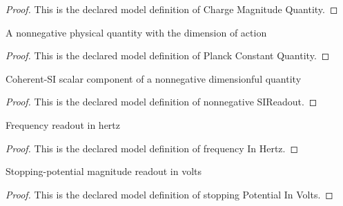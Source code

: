 \begin{proof}
  This is the declared model definition of Charge Magnitude Quantity.
\end{proof}
\begin{definition}
  \label{def:physics:phyx-mini-0549:phyxminiproblems-problemphyxmini0549-planckconstantquantity}
  A nonnegative physical quantity with the dimension of action
\end{definition}
\begin{proof}
  This is the declared model definition of Planck Constant Quantity.
\end{proof}
\begin{definition}
  \label{def:physics:phyx-mini-0549:phyxminiproblems-problemphyxmini0549-nonnegativesireadout}
  Coherent-SI scalar component of a nonnegative dimensionful quantity
\end{definition}
\begin{proof}
  This is the declared model definition of nonnegative SIReadout.
\end{proof}
\begin{definition}
  \label{def:physics:phyx-mini-0549:phyxminiproblems-problemphyxmini0549-frequencyinhertz}
  Frequency readout in hertz
\end{definition}
\begin{proof}
  This is the declared model definition of frequency In Hertz.
\end{proof}
\begin{definition}
  \label{def:physics:phyx-mini-0549:phyxminiproblems-problemphyxmini0549-stoppingpotentialinvolts}
  Stopping-potential magnitude readout in volts
\end{definition}
\begin{proof}
  This is the declared model definition of stopping Potential In Volts.
\end{proof}

